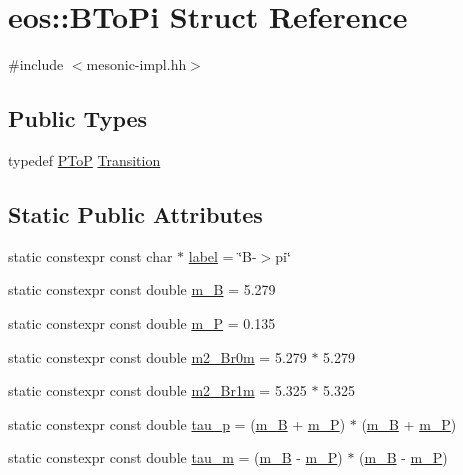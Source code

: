 \hypertarget{structeos_1_1BToPi}{
\section{eos::BToPi Struct Reference}
\label{structeos_1_1BToPi}
}


{\ttfamily \#include $<$mesonic-\/impl.hh$>$}\subsection*{Public Types}
\begin{DoxyCompactItemize}
\item 
typedef \hyperlink{structeos_1_1PToP}{PToP} \hyperlink{structeos_1_1BToPi_a0bc02dc01a331ef172cac61430529a37}{Transition}
\end{DoxyCompactItemize}
\subsection*{Static Public Attributes}
\begin{DoxyCompactItemize}
\item 
static constexpr const char $\ast$ \hyperlink{structeos_1_1BToPi_a02bedb913444a200791347fcebc02660}{label} = \char`\"{}B-\/$>$pi\char`\"{}
\item 
static constexpr const double \hyperlink{structeos_1_1BToPi_a368ef58c6e0296a92246459961bb1898}{m\_\-B} = 5.279
\item 
static constexpr const double \hyperlink{structeos_1_1BToPi_a3ae475ef38ac384d05ace3e6e4f8c4e1}{m\_\-P} = 0.135
\item 
static constexpr const double \hyperlink{structeos_1_1BToPi_a4bef4550fbc2f545cb28289cde71cf50}{m2\_\-Br0m} = 5.279 $\ast$ 5.279
\item 
static constexpr const double \hyperlink{structeos_1_1BToPi_a4e334a932389c4f346a1d7d685e3f6cc}{m2\_\-Br1m} = 5.325 $\ast$ 5.325
\item 
static constexpr const double \hyperlink{structeos_1_1BToPi_a1fd711c0a854118ef42495b16d2b0419}{tau\_\-p} = (\hyperlink{structeos_1_1BToPi_a368ef58c6e0296a92246459961bb1898}{m\_\-B} + \hyperlink{structeos_1_1BToPi_a3ae475ef38ac384d05ace3e6e4f8c4e1}{m\_\-P}) $\ast$ (\hyperlink{structeos_1_1BToPi_a368ef58c6e0296a92246459961bb1898}{m\_\-B} + \hyperlink{structeos_1_1BToPi_a3ae475ef38ac384d05ace3e6e4f8c4e1}{m\_\-P})
\item 
static constexpr const double \hyperlink{structeos_1_1BToPi_ac77ffd0ef98e06372594d0eba51118e6}{tau\_\-m} = (\hyperlink{structeos_1_1BToPi_a368ef58c6e0296a92246459961bb1898}{m\_\-B} -\/ \hyperlink{structeos_1_1BToPi_a3ae475ef38ac384d05ace3e6e4f8c4e1}{m\_\-P}) $\ast$ (\hyperlink{structeos_1_1BToPi_a368ef58c6e0296a92246459961bb1898}{m\_\-B} -\/ \hyperlink{structeos_1_1BToPi_a3ae475ef38ac384d05ace3e6e4f8c4e1}{m\_\-P})
\end{DoxyCompactItemize}


